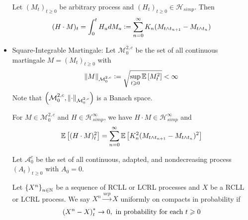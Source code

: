 \documentclass[a4paper,12pt]{article}
\begin{document}
\begin{itemize}
  \noindent Let $(M_t)_{t \geqslant 0}$ be arbitrary process and $(H_t)_{t \geqslant 0} \in \mathcal{H}_{simp}$. Then
  \begin{equation*}
    (H \cdot M)_t = \int_0^tH_udM_u \vcentcolon= \sum_{n=0}^{\infty} K_n(M_{t \wedge t_{n+1}} - M_{t \wedge t_n})
  \end{equation*}

  \item Square-Integrable Martingale: Let $\mathcal{M}_0^{2,c}$ be the set of all continuous martingale $M=(M_t)_{t \geqslant 0}$ with
  \begin{equation*}
    \left\lVert M\right\lVert_{\mathcal{M}_0^{2,c}} \vcentcolon= \sqrt{\sup_{t \geqslant 0}\mathbb{E}\left[M_t^2\right]} < \infty
  \end{equation*}
  Note that $\left(\mathcal{M}_0^{2,c}, \left\lVert\cdot\right\lVert_{\mathcal{M}_0^{2,c}}\right)$ is a Banach space.

  \begin{prop}
    For $M \in \mathcal{M}_0^{2,c}$ and $H \in \mathcal{H}_{simp}^{\infty}$, we have $H \cdot M \in \mathcal{H}_{simp}^{\infty}$ and
    \begin{equation*}
      \mathbb{E}\left[(H \cdot M)_t^2\right] = \sum_{n=0}^{\infty}\mathbb{E}\left[K_n^2(M_{t \wedge t_{n+1}} - M_{t \wedge t_n})^2\right]
    \end{equation*}
  \end{prop}

  \noindent Let $\mathcal{A}_0^c$ be the set of all continuous, adapted, and nondecreasing process $(A_t)_{t \geqslant 0}$ with $A_0 = 0$. 

  \noindent Let $\left\{X^n\right\}_{n \in \mathbb{N}}$ be a sequence of RCLL or LCRL processes and $X$ be a RCLL or LCRL process. We say $X^n \xrightarrow{ucp} X$ uniformly on compacts in probability if
  \begin{equation*}
    \left(X^n - X\right)_t^* \rightarrow 0,~\text{in probability for each }t \geqslant 0
  \end{equation*}


\end{itemize}
\end{document}
